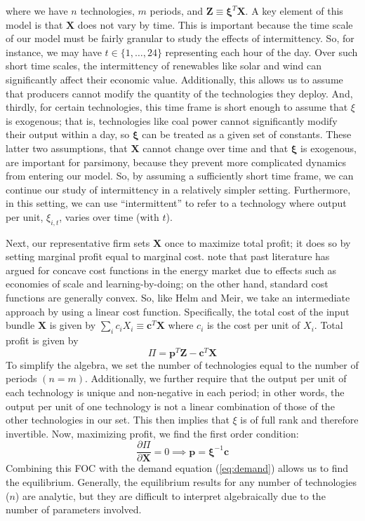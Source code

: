 \documentclass[11pt,a4paper,leqno]{extarticle}
\begin{document}
	where we have $n$ technologies, $m$ periods, and $\mathbf{Z} \equiv \boldsymbol{\xi}^T \mathbf{X}$. A key element of this model is that $\mathbf{X}$ does not vary by time. This is important because the time scale of our model must be fairly granular to study the effects of intermittency. So, for instance, we may have $t \in \{ 1, \dots, 24\}$ representing each hour of the day. Over such short time scales, the intermittency of renewables like solar and wind can significantly affect their economic value. Additionally, this allows us to assume that producers cannot modify the quantity of the technologies they deploy. And, thirdly, for certain technologies, this time frame is short enough to assume that $\xi$ is exogenous; that is, technologies like coal power cannot significantly modify their output within a day, so $\boldsymbol{\xi}$ can be treated as a given set of constants. These latter two assumptions, that $\mathbf{X}$ cannot change over time and that $\boldsymbol{\xi}$ is exogenous, are important for parsimony, because they prevent more complicated dynamics from entering our model. So, by assuming a sufficiently short time frame, we can continue our study of intermittency in a relatively simpler setting. Furthermore, in this setting, we can use ``intermittent'' to refer to a technology where output per unit, $\xi_{i,t}$, varies over time (with $t$). 	
	
	
	Next, our representative firm sets $\mathbf{X}$ once to maximize total profit; it does so by setting marginal profit equal to marginal cost.  \citet{HH} note that past literature has argued for concave cost functions in the energy market due to effects such as economies of scale and learning-by-doing; on the other hand, standard cost functions are generally convex. So, like Helm and Meir, we take an intermediate approach by using a linear cost function. Specifically, the total cost of the input bundle $\mathbf{X}$ is given by $ \sum_i c_i X_i \equiv \mathbf{c}^T \mathbf{X}$ where $c_i$ is the cost per unit of $X_i$. Total profit is given by 
	\begin{equation}
	\Pi = \mathbf{p}^T \mathbf{Z} - \mathbf{c}^T \mathbf{X}
	\end{equation}
	To simplify the algebra, we set the number of technologies equal to the number of periods $(n=m)$. Additionally, we further require that the output per unit of each technology is unique and non-negative in each period; in other words, the output per unit of one technology is not a linear combination of those of the other technologies in our set. This then implies that $\xi$ is of full rank and therefore invertible.  Now, maximizing profit, we find the first order condition:
	\begin{equation}\label{eq:firm_foc}
	\frac{\partial \Pi}{\partial \mathbf{X}} = 0 \implies \mathbf{p} =  \boldsymbol{\xi}^{-1} \mathbf{c}
	\end{equation}
	Combining this FOC with the demand equation (\autoref{eq:demand}) allows us to find the equilibrium. Generally, the equilibrium results for any number of technologies ($n$) are analytic, but they are difficult to interpret algebraically due to the number of parameters involved. 
	
\end{document}

